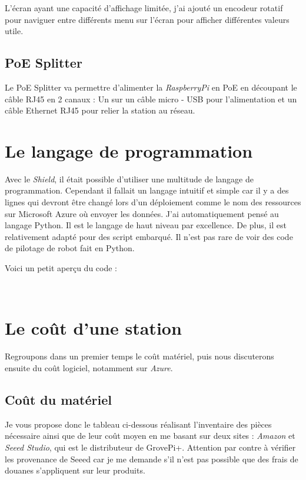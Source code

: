 L'écran ayant une capacité d'affichage limitée, j'ai ajouté un encodeur rotatif pour naviguer entre différents menu sur l'écran pour afficher différentes valeurs utile.\\

\subsection{PoE Splitter}

Le PoE Splitter va permettre d'alimenter la \textit{RaspberryPi} en PoE en découpant le câble RJ45 en 2 canaux : Un sur un câble micro - USB pour l'alimentation et un câble Ethernet RJ45 pour relier la station au réseau.

\section{Le langage de programmation}

Avec le \textit{Shield}, il était possible d'utiliser une multitude de langage de programmation. Cependant il fallait un langage intuitif et simple car il y a des lignes qui devront être changé lors d'un déploiement comme le nom des ressources sur Microsoft Azure où envoyer les données. J'ai automatiquement pensé au langage Python. Il est le langage de haut niveau par excellence. De plus, il est relativement adapté pour des script embarqué. Il n'est pas rare de voir des code de pilotage de robot fait en Python.

Voici un petit aperçu du code : 

\newpage
{}\\

\section{Le coût d'une station}

Regroupons dans un premier temps le coût matériel, puis nous discuterons ensuite du coût logiciel, notamment sur \textit{Azure}.\\

\subsection{Coût du matériel}

Je vous propose donc le tableau ci-dessous réalisant l'inventaire des pièces nécessaire ainsi que de leur coût moyen en me basant sur deux sites : \textit{Amazon} et \textit{Seeed Studio}, qui est le distributeur de GrovePi+. Attention par contre à vérifier les provenance de Seeed car je me demande s'il n'est pas possible que des frais de douanes s'appliquent sur leur produits.

